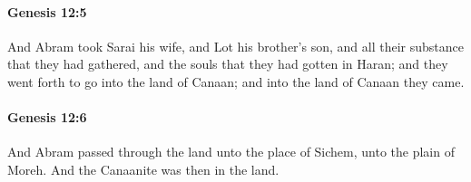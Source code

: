 		\paragraph{Genesis 12:5} %
			\label{GENESIS-12-5}

			And Abram took Sarai his wife, and Lot his brother's son, and all their substance that they had gathered, and the souls that they had gotten in Haran; and they went forth to go into the land of Canaan; and into the land of Canaan they came.


		\paragraph{Genesis 12:6} %
			\label{GENESIS-12-6}

			And Abram passed through the land unto the place of Sichem, unto the plain of Moreh. And the Canaanite was then in the land.


